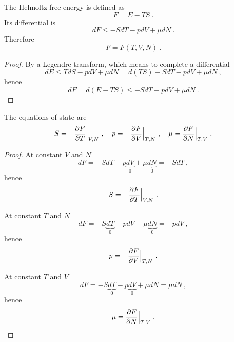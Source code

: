     The Helmoltz free energy is defined as 
    \begin{equation*}
        F = E - TS ~.
    \end{equation*}
    Its differential is 
    \begin{equation}\label{td:d:f}
        dF \leq - S dT - p dV + \mu dN ~.
    \end{equation}
    Therefore
    \begin{equation*}
        F = F(T, V, N) ~.
    \end{equation*}
    \begin{proof}
        By a Legendre transform, which means to complete a differential
        \begin{equation*}
            dE \leq T dS - p dV + \mu dN = d(TS) - S dT - p dV + \mu dN ~,
        \end{equation*}
        hence 
        \begin{equation*}
            dF = d(E - TS) \leq - S dT - p dV + \mu dN ~.
        \end{equation*}
    \end{proof}

    The equations of state are
    \begin{equation}\label{td:es:f}
        S = - \frac{\partial F}{\partial T} \Big \vert_{V,N} ~, \quad p = - \frac{\partial F}{\partial V} \Big \vert_{T,N} ~, \quad \mu = \frac{\partial F}{\partial N} \Big \vert_{T,V} ~. 
    \end{equation}
    \begin{proof}
        At constant $V$ and $N$
        \begin{equation*}
            dF = - S dT - p \underbrace{dV}_0 + \mu \underbrace{dN}_0 = - S dT~,
        \end{equation*}
        hence 
        \begin{equation*}
            S = - \frac{\partial F}{\partial T} \Big \vert_{V,N} ~.
        \end{equation*}

        At constant $T$ and $N$
        \begin{equation*}
            dF = - S \underbrace{dT}_0 - p dV + \mu \underbrace{dN}_0 = - pdV ~,
        \end{equation*}
        hence 
        \begin{equation*}
            p = - \frac{\partial F}{\partial V} \Big \vert_{T,N} ~.
        \end{equation*}

        At constant $T$ and $V$
        \begin{equation*}
            dF = - S \underbrace{dT}_0 - p \underbrace{dV}_0 + \mu dN = \mu dN~,
        \end{equation*}
        hence 
        \begin{equation*}
            \mu = \frac{\partial F}{\partial N} \Big \vert_{T,V} ~.
        \end{equation*}
    \end{proof}

